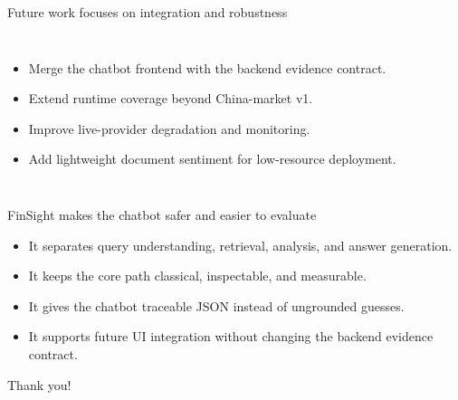 \documentclass[10pt]{beamer}
\begin{document}
\begin{frame}{Future work focuses on integration and robustness}
  \begin{columns}[T,onlytextwidth]
      \begin{itemize}
        \item Merge the chatbot frontend with the backend evidence contract.
        \item Extend runtime coverage beyond China-market v1.
        \item Improve live-provider degradation and monitoring.
        \item Add lightweight document sentiment for low-resource deployment.
      \end{itemize}
  \end{columns}
\end{frame}

\begin{frame}{FinSight makes the chatbot safer and easier to evaluate}
  \begin{itemize}
    \item It separates query understanding, retrieval, analysis, and answer generation.
    \item It keeps the core path classical, inspectable, and measurable.
    \item It gives the chatbot traceable JSON instead of ungrounded guesses.
    \item It supports future UI integration without changing the backend evidence contract.
  \end{itemize}
  \vspace{1em}
  \textcolor{myNewColorA}{\Huge{\centerline{Thank you!}}}
\end{frame}
\end{document}
